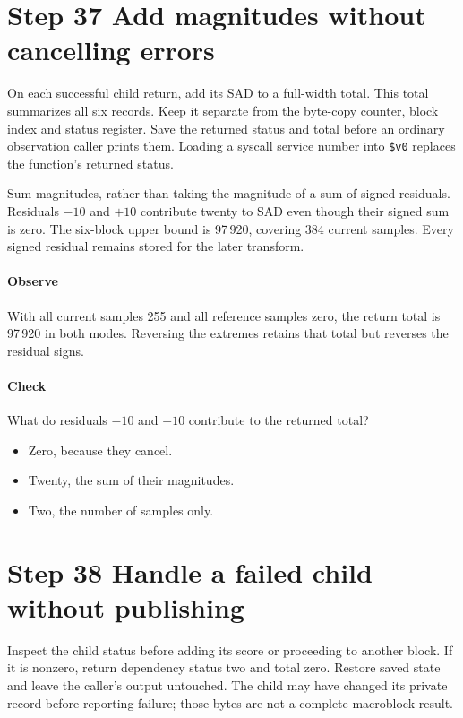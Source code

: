 \section{Step 37 Add magnitudes without cancelling errors}\label{h263-macroblock-s07}
On each successful child return, add its SAD to a full-width total. This total
summarizes all six records. Keep it separate from the byte-copy counter, block
index and status register. Save the returned status and total before an
ordinary observation caller prints them. Loading a syscall service number into
\texttt{\$v0} replaces the function's returned status.

Sum magnitudes, rather than taking the magnitude of a sum of signed residuals.
Residuals $-10$ and $+10$ contribute twenty to SAD even though their signed sum
is zero. The six-block upper bound is 97\,920, covering 384 current samples.
Every signed residual remains stored for the later transform.

\paragraph{Observe} With all current samples 255 and all reference samples zero,
the return total is 97\,920 in both modes. Reversing the extremes retains that
total but reverses the residual signs.
\paragraph{Check} What do residuals $-10$ and $+10$ contribute to the returned total?
\begin{itemize}
  \item[A.] Zero, because they cancel.
  \item[B.] Twenty, the sum of their magnitudes.
  \item[C.] Two, the number of samples only.
\end{itemize}

\section{Step 38 Handle a failed child without publishing}\label{h263-macroblock-s08}
Inspect the child status before adding its score or proceeding to another block.
If it is nonzero, return dependency status two and total zero. Restore saved state
and leave the caller's output untouched. The child may have changed its private
record before reporting failure; those bytes are not a complete macroblock result.

